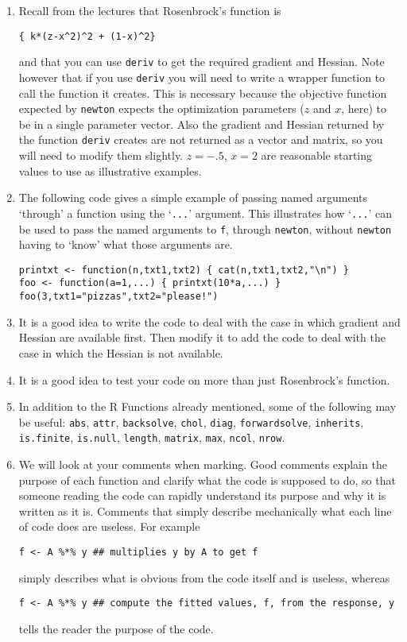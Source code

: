 \documentclass[10pt] {article}
\begin{document}
\begin{enumerate} 
\item Recall from the lectures that Rosenbrock's function is
\begin{verbatim}
{ k*(z-x^2)^2 + (1-x)^2}
\end{verbatim} 
and that you can use {\tt deriv} to get the required gradient and Hessian. Note however that if you use {\tt deriv} you will need to write a wrapper function to call the function it creates. This is necessary because the objective function expected by {\tt newton} expects the optimization parameters ($z$ and $x$, here) to be in a single parameter vector. Also the gradient and Hessian returned by the function {\tt deriv} creates are not returned as a vector and matrix, so you will need to modify them slightly. $z=-.5$, $x=2$ are reasonable starting values to use as illustrative examples. 
\item The following code gives a simple example of passing named arguments `through' a function using the `\verb+...+' argument. This illustrates how `\verb+...+' can be used to pass the named arguments to {\tt f}, through {\tt newton}, without {\tt newton} having to `know' what those arguments are. 
\begin{verbatim}
printxt <- function(n,txt1,txt2) { cat(n,txt1,txt2,"\n") }
foo <- function(a=1,...) { printxt(10*a,...) }
foo(3,txt1="pizzas",txt2="please!")
\end{verbatim}
\item It is a good idea to write the code to deal with the case in which gradient and Hessian are available first. Then modify it to add the code to deal with the case in which the Hessian is not available.
\item It is a good idea to test your code on more than just Rosenbrock's function. 
\item In addition to the R Functions already mentioned, some of the following may be useful: {\tt abs}, {\tt attr},   {\tt backsolve}, {\tt chol}, {\tt diag}, {\tt forwardsolve}, {\tt inherits}, {\tt is.finite}, {\tt is.null}, {\tt length}, {\tt matrix}, {\tt max}, {\tt ncol}, {\tt nrow}.
\item We will look at your comments when marking. Good comments explain the purpose of each function and clarify what the code is supposed to do, so that someone reading the code can rapidly understand its purpose and why it is written as it is. Comments that simply describe mechanically what each line of code does  are useless. For example
\begin{verbatim}
f <- A %*% y ## multiplies y by A to get f
\end{verbatim}
simply describes what is obvious from the code itself and is useless, whereas
\begin{verbatim}
f <- A %*% y ## compute the fitted values, f, from the response, y
\end{verbatim}
tells the reader the purpose of the code. 

\end{enumerate}
\end{document}
